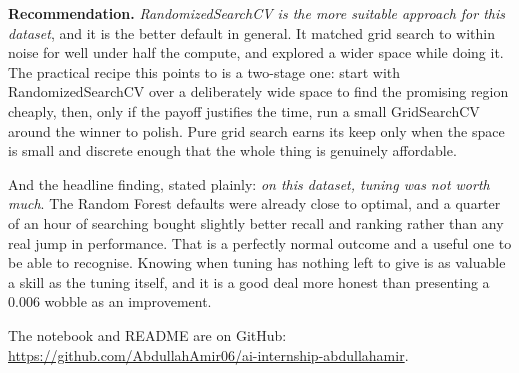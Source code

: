 \documentclass[11pt,a4paper]{article}
\begin{document}
\textbf{Recommendation.} \emph{RandomizedSearchCV is the more suitable approach for
this dataset}, and it is the better default in general. It matched grid search to
within noise for well under half the compute, and explored a wider space while doing
it. The practical recipe this points to is a two-stage one: start with
RandomizedSearchCV over a deliberately wide space to find the promising region
cheaply, then, only if the payoff justifies the time, run a small GridSearchCV around
the winner to polish. Pure grid search earns its keep only when the space is small and
discrete enough that the whole thing is genuinely affordable.

And the headline finding, stated plainly: \emph{on this dataset, tuning was not worth
much}. The Random Forest defaults were already close to optimal, and a quarter of an
hour of searching bought slightly better recall and ranking rather than any real jump
in performance. That is a perfectly normal outcome and a useful one to be able to
recognise. Knowing when tuning has nothing left to give is as valuable a skill as the
tuning itself, and it is a good deal more honest than presenting a 0.006 wobble as an
improvement.

\vspace{0.4cm}
The notebook and README are on GitHub:
\url{https://github.com/AbdullahAmir06/ai-internship-abdullahamir}.
\end{document}
